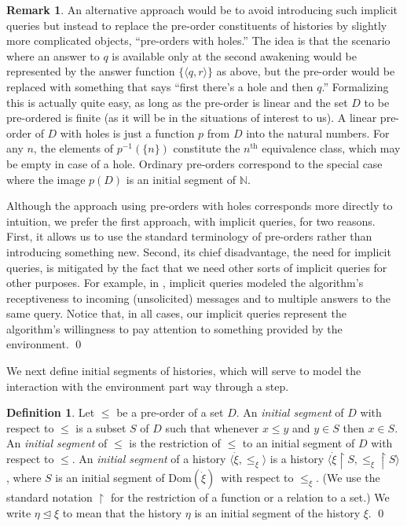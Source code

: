 \documentclass{LMCS}
\theoremstyle{definition}
\newtheorem{df}[thm]{Definition}
\newtheorem{rmk}[thm]{Remark}
\newcommand{\ans}{\dot}
\newcommand{\bbb}[1]{\ensuremath{\mathbb {#1}}}
\newcommand{\dom}[1]{\ensuremath{{\text{Dom}}(#1)}}
\newcommand{\restr}{\mathop{\upharpoonright}}
\newcommand{\sq}[1]{\ensuremath{\langle#1\rangle}}
\renewcommand{\th}{\ensuremath{{}^{\text{th}}}}
\newcommand{\initeq}{\unlhd}
\begin{document}
\begin{rmk}
An alternative approach would be to avoid introducing such implicit
queries but instead to replace the pre-order constituents of histories
by slightly more complicated objects, ``pre-orders with holes.''  The
idea is that the scenario where an answer to $q$ is available only at
the second awakening would be represented by the answer function
$\{\sq{q,r}\}$ as above, but the pre-order would be replaced with
something that says ``first there's a hole and then $q$.''
Formalizing this is actually quite easy, as long as the pre-order is
linear and the set $D$ to be pre-ordered is finite (as it will be in
the situations of interest to us).  A linear pre-order of $D$ with
holes is just a function $p$ from $D$ into the natural numbers.
For any $n$, the elements of $p^{-1}(\{n\})$ constitute the $n\th$
equivalence class, which may be empty in case of a hole.  Ordinary
pre-orders correspond to the special case where the image $p(D)$ is an
initial segment of \bbb N.

Although the approach using pre-orders with holes corresponds more
directly to intuition, we prefer the first approach, with implicit
queries, for two reasons.  First, it allows us to use the standard
terminology of pre-orders rather than introducing something new.
Second, its chief disadvantage, the need for implicit queries, is
mitigated by the fact that we need other sorts of implicit queries for
other purposes.  For example, in \cite[Section~2]{oa1}, implicit
queries modeled the algorithm's receptiveness to incoming
(unsolicited) messages and to multiple answers to the same query.
Notice that, in all cases, our implicit queries represent the
algorithm's willingness to pay attention to something provided by the
environment.
\qed\end{rmk}

We next define initial segments of histories, which will serve to
model the interaction with the environment part way through a step.

\begin{df}
Let $\leq$ be a pre-order of a set $D$.  An \emph{initial segment} of
$D$ with respect to $\leq$ is a subset $S$ of $D$ such that whenever
$x\leq y$ and $y\in S$ then $x\in S$.  An \emph{initial segment} of
$\leq$ is the restriction of $\leq$ to an initial segment of $D$ with
respect to $\leq$.  An \emph{initial segment} of a history
\sq{{\ans\xi},\leq_\xi} is a history \sq{{\ans\xi}\restr
S,\leq_\xi\restr S}, where $S$ is an initial segment of \dom{\ans\xi}\ with
respect to $\leq_\xi$.  (We use the standard notation $\restr$ for the
restriction of a function or a relation to a set.)  We write
$\eta\initeq\xi$ to mean that the history $\eta$ is an initial segment
of the history $\xi$.
\qed\end{df}
\end{document}
